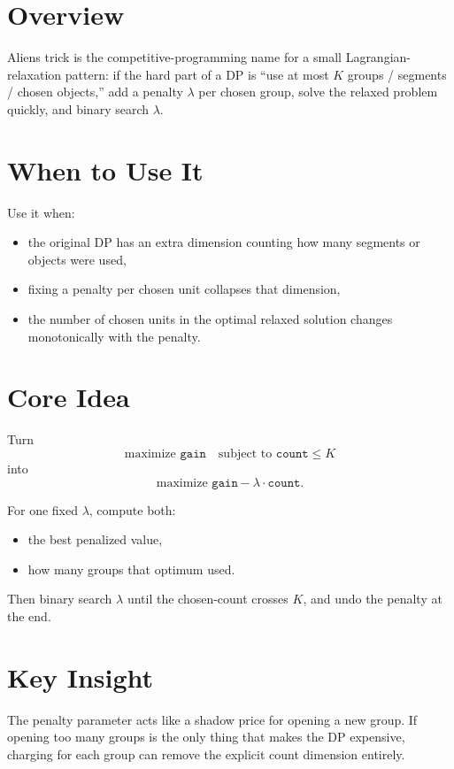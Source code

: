 \section*{Overview}

Aliens trick is the competitive-programming name for a small Lagrangian-relaxation pattern: if the hard part of a DP is
``use at most \(K\) groups / segments / chosen objects,'' add a penalty \(\lambda\) per chosen group, solve the relaxed
problem quickly, and binary search \(\lambda\).

\section*{When to Use It}

Use it when:

\begin{itemize}
  \item the original DP has an extra dimension counting how many segments or objects were used,
  \item fixing a penalty per chosen unit collapses that dimension,
  \item the number of chosen units in the optimal relaxed solution changes monotonically with the penalty.
\end{itemize}

\section*{Core Idea}

Turn
\[
\text{maximize } \texttt{gain} \quad \text{subject to } \texttt{count} \le K
\]
into
\[
\text{maximize } \texttt{gain} - \lambda \cdot \texttt{count}.
\]

For one fixed \(\lambda\), compute both:

\begin{itemize}
  \item the best penalized value,
  \item how many groups that optimum used.
\end{itemize}

Then binary search \(\lambda\) until the chosen-count crosses \(K\), and undo the penalty at the end.

\section*{Key Insight}

The penalty parameter acts like a shadow price for opening a new group. If opening too many groups is the only thing
that makes the DP expensive, charging for each group can remove the explicit count dimension entirely.

